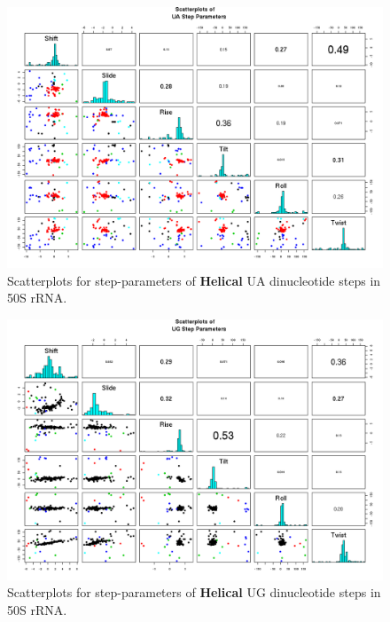 \begin{figure}[H]
\centering
\includegraphics[angle=90, scale=0.6]{Helical/UA.png}
\caption{Scatterplots for step-parameters of \textbf{Helical} UA dinucleotide steps
in 50S rRNA.}
\label{fig:stepsUA}
\end{figure}

\begin{figure}[H]
\centering
\includegraphics[angle=90, scale=0.6]{Helical/UG.png}
\caption{Scatterplots for step-parameters of \textbf{Helical} UG dinucleotide steps
in 50S rRNA.}
\label{fig:stepsUG}
\end{figure}

